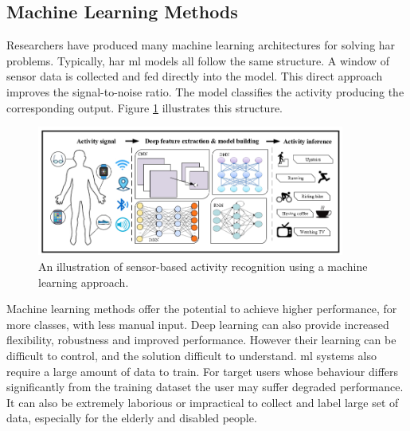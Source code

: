 \subsection{Machine Learning Methods}
Researchers have produced many machine learning architectures for solving \acrshort{har} problems\cite{Wang2019b}. Typically, \acrshort{har} \acrshort{ml} models all follow the same structure. A window of sensor data is collected and fed directly into the model. This direct approach improves the signal-to-noise ratio\cite{Hernandez2021}. The model classifies the activity producing the corresponding output. Figure \ref{fig:back-sensor-based-deep-learning} illustrates this structure.\cite{Wang2019b}

\begin{figure}
    \centering
    \includegraphics[width=0.9\textwidth]{content/2-Background/sensor-based-deep-learning.png}
    \caption[An illustration of sensor-based machine learning activity recognition]{An illustration of sensor-based activity recognition using a machine learning approach\cite{Wang2019b}.}
    \label{fig:back-sensor-based-deep-learning}
\end{figure}

Machine learning methods offer the potential to achieve higher performance, for more classes, with less manual input\cite{Hernandez2021, Zhu2019, Rai2019}. Deep learning can also provide increased flexibility, robustness and improved performance. However their learning can be difficult to control, and the solution difficult to understand\cite{Edwards2018, Greff2017}. \acrshort{ml} systems also require a large amount of data to train\cite{Nguyen2021a}. For target users whose behaviour differs significantly from the training dataset the user may suffer degraded performance. It can also be extremely laborious or impractical to collect and label large set of data, especially for the elderly and disabled people.\cite{Qiu2022}

